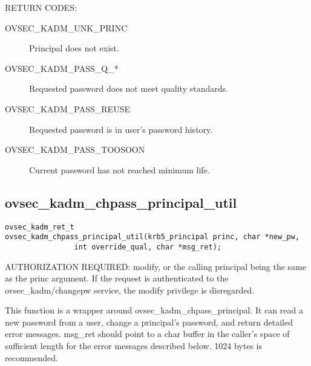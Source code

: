 RETURN CODES:

\begin{description}
\item[OVSEC_KADM_UNK_PRINC] Principal does not exist.
\item[OVSEC_KADM_PASS_Q_*] Requested password does not meet quality
standards. 
\item[OVSEC_KADM_PASS_REUSE] Requested password is in user's
password history. 
\item[OVSEC_KADM_PASS_TOOSOON] Current password has not reached minimum
life. 
\end{description}


\subsection{ovsec_kadm_chpass_principal_util}

\begin{verbatim}
ovsec_kadm_ret_t
ovsec_kadm_chpass_principal_util(krb5_principal princ, char *new_pw, 
                int override_qual, char *msg_ret);
\end{verbatim}

AUTHORIZATION REQUIRED: modify, or the calling principal being the
same as the princ argument.  If the request is authenticated to the
ovsec_kadm/changepw service, the modify privilege is disregarded.

This function is a wrapper around ovsec_kadm_chpass_principal. It can
read a new password from a user, change a principal's password, and
return detailed error messages.  msg_ret should point to a char buffer
in the caller's space of sufficient length for the error messages
described below. 1024 bytes is recommended.


